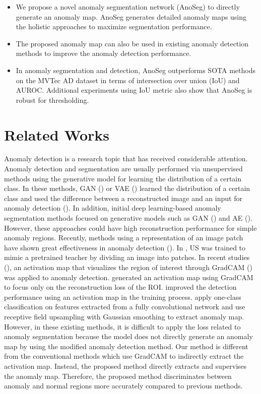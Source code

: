 \documentclass{article} \usepackage{iclr2022_conference,times}
\begin{document}
\begin{itemize}
\item We propose a novel anomaly segmentation network (AnoSeg) to directly generate an anomaly map. AnoSeg generates detailed anomaly maps using the holistic approaches to maximize segmentation performance.
\item The proposed anomaly map can also be used in existing anomaly detection methods to improve the anomaly detection performance. 
\item In anomaly segmentation and detection, AnoSeg outperforms SOTA methods on the MVTec AD dataset in terms of intersection over union (IoU) and AUROC. Additional experiments using IoU metric also show that AnoSeg is robust for thresholding.
\end{itemize}




\section{Related Works}
Anomaly detection is a research topic that has received considerable attention. Anomaly detection and segmentation are usually performed via unsupervised methods using the generative model for learning the distribution of a certain class. In these methods, GAN (\cite{gan}) or VAE (\cite{vae}) learned the distribution of a certain class and used the difference between a reconstructed image and an input for anomaly detection (\cite{re8,re10, re12,alocc}). In addition, initial deep learning-based anomaly segmentation methods focused on generative models such as GAN (\cite{anog}) and AE (\cite{mvtec}). However, these approaches could have high reconstruction performance for simple anomaly regions. Recently, methods using a representation of an image patch have shown great effectiveness in anomaly detection (\cite{patch, spa}). In \cite{stu}, US was trained to mimic a pretrained teacher by dividing an image into patches. In recent studies (\cite{cut}), an activation map that visualizes the region of interest through GradCAM (\cite{grad}) was applied to anomaly detection. \cite{att} generated an activation map using GradCAM to focus only on the reconstruction loss of the ROI. \cite{eatt} improved the detection performance using an activation map in the training process. \cite{fcdd} apply one-class classification on features extracted from a fully convolutional network and use receptive field upsampling with Gaussian smoothing to extract anomaly map. However, in these existing methods, it is difficult to apply the loss related to anomaly segmentation because the model does not directly generate an anomaly map by using the modified anomaly detection method. Our method is different from the conventional methods which use GradCAM to indirectly extract the activation map. Instead, the proposed method directly extracts and supervises the anomaly map. Therefore, the proposed method discriminates between anomaly and normal regions more accurately compared to previous methods.
\end{document}
